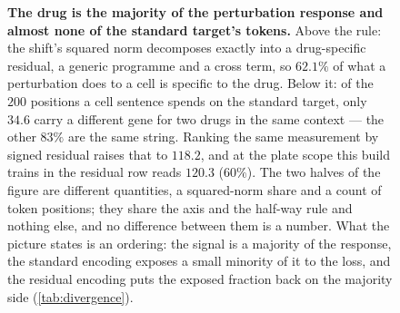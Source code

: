 \begin{figure}[htbp]
\caption[The drug is most of the response, little of the
target]{\textbf{The drug is the majority of the perturbation response and almost
none of the standard target's tokens.} Above the rule: the shift's squared
norm decomposes exactly into a drug-specific residual, a generic programme and
a cross term, so $62.1\%$ of what a perturbation does to a cell is specific to
the drug. Below it: of the $200$ positions a cell sentence spends on the
standard target, only $34.6$ carry a different gene for two drugs in the same
context --- the other $83\%$ are the same string. Ranking the same measurement
by signed residual raises that to $118.2$, and at the plate scope this build
trains in the residual row reads $120.3$ ($60\%$). The two halves of the figure
are different quantities, a squared-norm share and a count of token positions;
they share the axis and the half-way rule and nothing else, and no difference
between them is a number. What the picture states is an ordering: the signal is
a majority of the response, the standard encoding exposes a small minority of
it to the loss, and the residual encoding puts the exposed fraction back on the
majority side (\cref{tab:divergence}).}
\label{fig:residual-energy}
\end{figure}
